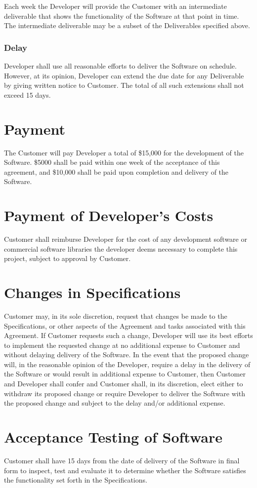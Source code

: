 \documentclass[11pt]{article}
\begin{document}
Each week the Developer will provide the Customer with an intermediate deliverable that shows the functionality of the Software at that point in time. The intermediate deliverable may be a subset of the Deliverables specified above. 
\subsubsection{Delay}
Developer shall use all reasonable efforts to deliver the Software on schedule. However, at its opinion, Developer can extend the due date for any Deliverable by giving written notice to Customer. The total of all such extensions shall not exceed 15 days. 
\section{Payment}	
The Customer will pay Developer a total of \$15,000 for the development of the Software. \$5000 shall be paid within one week of the acceptance of this agreement, and \$10,000 shall be paid upon completion and delivery of the Software.
\section{Payment of Developer’s Costs}
Customer shall reimburse Developer for the cost of any development software or commercial software libraries the developer deems necessary to complete this project, subject to approval by Customer.
\section{Changes in Specifications}
Customer may, in its sole discretion, request that changes be made to the Specifications, or other aspects of the Agreement and tasks associated with this Agreement. If Customer requests such a change, Developer will use its best efforts to implement the requested change at no additional expense to Customer and without delaying delivery of the Software. In the event that the proposed change will, in the reasonable opinion of the Developer, require a delay in the delivery of the Software or would result in additional expense to Customer, then Customer and Developer shall confer and Customer shall, in its discretion, elect either to withdraw its proposed change or require Developer to deliver the Software with the proposed change and subject to the delay and/or additional expense.
\section{Acceptance Testing of Software}
Customer shall have 15 days from the date of delivery of the Software in final form to inspect, test and evaluate it to determine whether the Software satisfies the functionality set forth in the Specifications.
\end{document}
